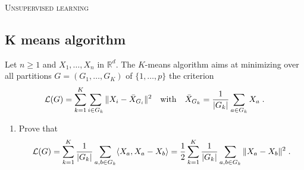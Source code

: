 \documentclass[a4paper,10pt,fleqn]{article}
\newcommand{\R}{\ensuremath{\mathbb{R}}}
\newcommand{\1}{\ensuremath{\mathbbm{1}}}
\newcommand{\crit}{\mathcal{L}}
\begin{document}
\noindent\hrulefill

\begin{center}
\textsc{Unsupervised learning}
\end{center}
\hrulefill

\medskip


\subsection*{K means algorithm}
Let $n\geqslant 1$ and  $X_{1},\ldots,X_{n}$ in $\R^d$.
The $K$-means algorithm aims at minimizing over all partitions $G=(G_{1},\ldots,G_{K})$ of $\{1,\ldots,p\}$ the criterion
$$
\crit(G)=\sum_{k=1}^K\sum_{i\in G_{k}}\|X_{i}-\bar{X}_{G_{i}}\|^2\quad \textrm{with}\quad \bar{X}_{G_{k}}={1\over |G_{k}|}\sum_{a\in G_{k}} X_{a}\;.
$$
\begin{enumerate}
\item Prove that
$$
\crit(G)=\sum_{k=1}^K{1\over |G_{k}|}\sum_{a,b\in G_{k}} \langle X_{a},X_{a}-X_{b}\rangle ={1\over 2}\sum_{k=1}^K{1\over |G_{k}|}\sum_{a,b\in G_{k}} \|X_{a}-X_{b}\|^2\;.
$$

\vspace{.2cm}


\end{enumerate}
\end{document}
